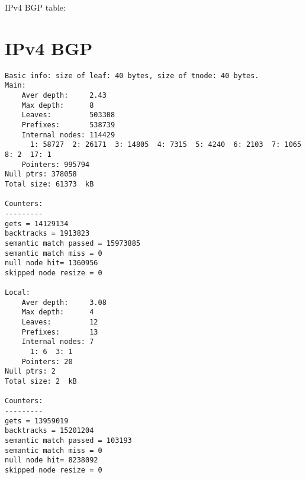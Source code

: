 IPv4 BGP table:




\section{IPv4 BGP}
\begin{lstlisting}
Basic info: size of leaf: 40 bytes, size of tnode: 40 bytes.
Main:
	Aver depth:     2.43
	Max depth:      8
	Leaves:         503308
	Prefixes:       538739
	Internal nodes: 114429
	  1: 58727  2: 26171  3: 14805  4: 7315  5: 4240  6: 2103  7: 1065  8: 2  17: 1
	Pointers: 995794
Null ptrs: 378058
Total size: 61373  kB

Counters:
---------
gets = 14129134
backtracks = 1913823
semantic match passed = 15973885
semantic match miss = 0
null node hit= 1360956
skipped node resize = 0

Local:
	Aver depth:     3.08
	Max depth:      4
	Leaves:         12
	Prefixes:       13
	Internal nodes: 7
	  1: 6  3: 1
	Pointers: 20
Null ptrs: 2
Total size: 2  kB

Counters:
---------
gets = 13959019
backtracks = 15201204
semantic match passed = 103193
semantic match miss = 0
null node hit= 8238092
skipped node resize = 0
\end{lstlisting}
